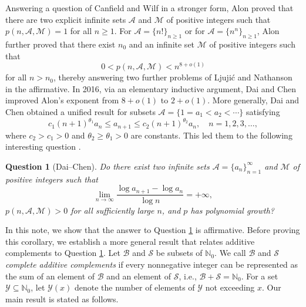 \documentclass[12pt,a4paper,reqno]{amsart}
\numberwithin{equation}{section}
\def\N{{\mathbb N}}
\theoremstyle{plain}
\newtheorem{question}{Question}
\theoremstyle{definition}
\begin{document}
Answering a question of Canfield and Wilf \cite{CW12} in a stronger form, Alon \cite{Al12} proved that there are two explicit infinite sets $\mathcal{A}$ and $\mathcal{M}$ of positive integers such that $p(n, \mathcal{A}, \mathcal{M})=1$ for all $n\ge 1$. For $\mathcal{A}=\{n!\}_{n\ge 1}$ or for $\mathcal{A}=\{n^n\}_{n\ge 1}$, Alon further proved that there exist $n_0$ and an infinite set $\mathcal{M}$ of positive integers such that 
$$
0<p(n, \mathcal{A}, \mathcal{M})<n^{8+o(1)}
$$ 
for all $n>n_0$, thereby answering two further problems of Ljuji\'c and Nathanson \cite{LN12} in the affirmative. In 2016, via an elementary inductive argument, Dai and Chen \cite{DC16} improved Alon's exponent from $8+o(1)$ to $2+o(1)$. More generally, Dai and Chen obtained a unified result for subsets $\mathcal{A}=\{1=a_1<a_2<\cdots\}$ satisfying
$$
c_1(n+1)^{\theta_1}a_n\le a_{n+1}\le c_2(n+1)^{\theta_2}a_n,\quad n=1,2,3,\ldots,
$$
where $c_2>c_1>0$ and $\theta_2\ge \theta_1>0$ are constants. This led them to the following interesting question \cite[Question 3.5]{DC16}.

\begin{question}[Dai--Chen]\label{question1}
Do there exist two infinite sets $\mathcal{A}=\{a_n\}_{n=1}^{\infty}$ and $\mathcal{M}$ of positive integers such that
$$
\lim_{n\to\infty}\frac{\log a_{n+1}-\log a_n}{\log n}=+\infty,
$$
$p(n,\mathcal{A},\mathcal{M})>0$ for all sufficiently large $n$, and $p$ has polynomial growth?
\end{question}

In this note, we show that the answer to Question \ref{question1} is affirmative. Before proving this corollary, we establish a more general result that relates additive complements to Question \ref{question1}. Let $\mathscr{B}$ and $\mathscr{S}$ be subsets of $\N_0$. We call $\mathscr{B}$ and $\mathscr{S}$ {\it complete additive complements} if every nonnegative integer can be represented as the sum of an element of $\mathscr{B}$ and an element of $\mathscr{S}$, i.e., $\mathscr{B}+\mathscr{S}=\N_0$.
For a set $\mathcal{Y}\subseteq\N_0$, let $\mathcal{Y}(x)$ denote the number of elements of $\mathcal{Y}$ not exceeding $x$. 
Our main result is stated as follows.
\end{document}
